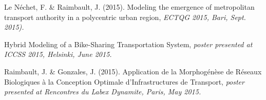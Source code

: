 \bigskip

\noindent Le Néchet, F. \& Raimbault, J. (2015). Modeling the emergence of metropolitan transport authority in a polycentric urban region, \textit{ECTQG 2015, Bari, Sept. 2015).}


\bigskip

\noindent Hybrid Modeling of a Bike-Sharing Transportation System, \textit{poster presented at ICCSS 2015, Helsinki, June 2015.}

\bigskip

\noindent Raimbault, J. \& Gonzales, J. (2015). Application de la Morphog{\'e}n{\`e}se de R{\'e}seaux Biologiques {\`a} la Conception Optimale d'Infrastructures de Transport, \textit{poster presented at Rencontres du Labex Dynamite, Paris, May 2015.}


